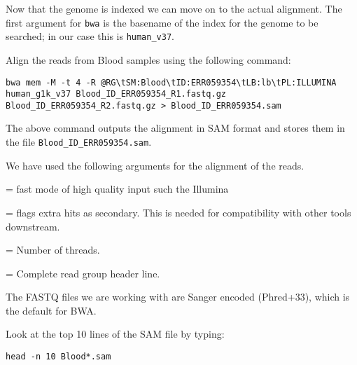 \begin{information}
Now that the genome is indexed we can move on to the actual alignment. The first
argument for \texttt{bwa} is the basename of the index for the genome to be searched;
in our case this is \texttt{human_v37}.

\end{information}

\begin{steps}
Align the reads from Blood samples using the following command: 

\begin{lstlisting}
bwa mem -M -t 4 -R @RG\tSM:Blood\tID:ERR059354\tLB:lb\tPL:ILLUMINA human_g1k_v37 Blood_ID_ERR059354_R1.fastq.gz Blood_ID_ERR059354_R2.fastq.gz > Blood_ID_ERR059354.sam
\end{lstlisting}

The above command outputs the alignment in SAM format and stores them in the
file \texttt{Blood_ID_ERR059354.sam}.
\end{steps}

\begin{note}
We have used the following arguments for the alignment of the reads.
\begin{description}[style=multiline,labelindent=0cm,align=right,leftmargin=\descriptionlabelspace,rightmargin=1.5cm,font=\ttfamily]
  \item[mem] = fast mode of high quality input such the Illumina
  \item[-M] = flags extra hits as secondary. This is needed for compatibility with other tools downstream.
  \item[-t] = Number of threads.
  \item[-R] = Complete read group header line.
\end{description}

The FASTQ files we are working with are Sanger encoded (Phred+33), which is the
default for BWA.

\end{note}

\begin{steps}
Look at the top 10 lines of the SAM file by typing:

\begin{lstlisting}
head -n 10 Blood*.sam
\end{lstlisting}
\end{steps}


